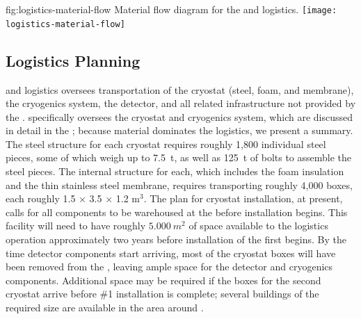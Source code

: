 \begin{dunefigure}{fig:logistics-material-flow}
  {Material flow diagram for the  and  logistics.}
 \texttt{[image: logistics-material-flow]}
\end{dunefigure}

\subsection{Logistics Planning}
\label{sec:fdsp-tc-logPln}

 and  logistics oversees transportation of the cryostat (steel, foam, and membrane), the cryogenics system, the detector, and all related infrastructure not provided by %
the .  specifically oversees the cryostat and cryogenics system, which %
are  discussed in detail in %
the  ; 
 because  material dominates the logistics, we present a summary. %
The %
steel structure for each cryostat requires %
roughly 1,800 individual steel pieces, %
some of which weigh up to \SI{7.5}{t}, as well as \SI{125}{t} of bolts to assemble the steel pieces. The internal structure for each, which includes the foam insulation and the thin stainless steel membrane, %
requires transporting roughly 4,000 boxes, 
 each roughly 1.5 $\times$ 3.5 $\times$ 1.2 m$^3$. The plan for cryostat installation, at present, calls for all components to be warehoused at the  before installation begins. %
This facility will need to have %
roughly $\SI{5,000}{m^2}$ of  space available to the logistics operation approximately two years before installation of the first  begins. By the time detector components start arriving, most of the cryostat boxes will have been removed from the , leaving ample space for the detector and cryogenics components. 
Additional space may be required if the boxes for the second cryostat arrive before   \#1 installation is complete; several buildings of the required size are available in the area around . %

